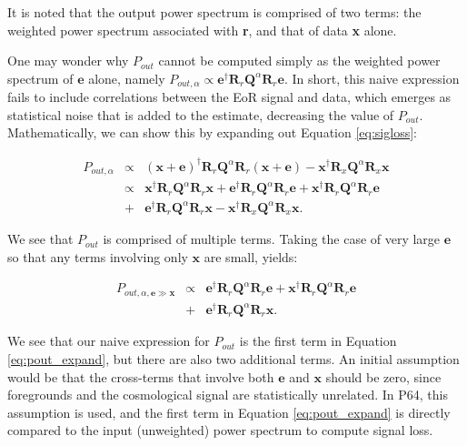 \documentclass[preprint2,numberedappendix,tighten]{aastex6}  %
\begin{document}
It is noted that the output power spectrum is comprised of two terms: the weighted power spectrum associated with \textbf{r}, and that of data \textbf{x} alone. 

One may wonder why $P_{out}$ cannot be computed simply as the weighted power spectrum of $\textbf{e}$ alone, namely $P_{out,\alpha} \propto \textbf{e}^{\dagger}\textbf{R}_{r}\textbf{Q}^{\alpha}\textbf{R}_{r}\textbf{e}$. In short, this naive expression fails to include correlations between the EoR signal and data, which emerges as statistical noise that is added to the estimate, decreasing the value of $P_{out}$. Mathematically, we can show this by expanding out Equation \eqref{eq:sigloss}:

\begin{eqnarray}
\label{eq:crossterm}
P_{out,\alpha} &\propto& (\textbf{x}+\textbf{e})^{\dagger}\textbf{R}_{r}\textbf{Q}^{\alpha}\textbf{R}_{r}(\textbf{x}+\textbf{e}) - \textbf{x}^{\dagger}\textbf{R}_{x}\textbf{Q}^{\alpha}\textbf{R}_{x}\textbf{x} \nonumber \\
&\propto& \textbf{x}^{\dagger}\textbf{R}_{r}\textbf{Q}^{\alpha}\textbf{R}_{r}\textbf{x} + \textbf{e}^{\dagger}\textbf{R}_{r}\textbf{Q}^{\alpha}\textbf{R}_{r}\textbf{e} + \textbf{x}^{\dagger}\textbf{R}_{r}\textbf{Q}^{\alpha}\textbf{R}_{r}\textbf{e} \nonumber \\
&+& \textbf{e}^{\dagger}\textbf{R}_{r}\textbf{Q}^{\alpha}\textbf{R}_{r}\textbf{x} - \textbf{x}^{\dagger}\textbf{R}_{x}\textbf{Q}^{\alpha}\textbf{R}_{x}\textbf{x}.
\end{eqnarray}

We see that $P_{out}$ is comprised of multiple terms. Taking the case of very large $\textbf{e}$ so that any terms involving only $\textbf{x}$ are small, yields:

\begin{eqnarray}
\label{eq:pout_expand}
P_{out, \alpha,\textbf{e} \gg \textbf{x}} &\propto& \textbf{e}^{\dagger}\textbf{R}_{r}\textbf{Q}^{\alpha}\textbf{R}_{r}\textbf{e} + \textbf{x}^{\dagger}\textbf{R}_{r}\textbf{Q}^{\alpha}\textbf{R}_{r}\textbf{e} \nonumber \\
&+& \textbf{e}^{\dagger}\textbf{R}_{r}\textbf{Q}^{\alpha}\textbf{R}_{r}\textbf{x}.
\end{eqnarray}

We see that our naive expression for $P_{out}$ is the first term in Equation \eqref{eq:pout_expand}, but there are also two additional terms. An initial assumption would be that the cross-terms that involve both $\textbf{e}$ and $\textbf{x}$ should be zero, since foregrounds and the cosmological signal are statistically unrelated. In P64, this assumption is used, and the first term in Equation \eqref{eq:pout_expand} is directly compared to the input (unweighted) power spectrum to compute signal loss.
\end{document}
